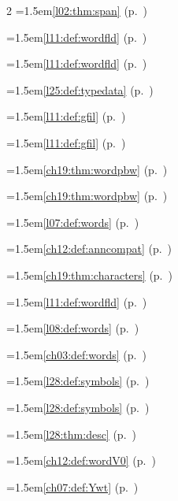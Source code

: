 \begin{multicols}{2}
\hangindent=1.5em\quad \ref{l02:thm:span} (p.~\pageref{l02:thm:span})\par
\hangindent=1.5em\quad \ref{l11:def:wordfld} (p.~\pageref{l11:def:wordfld})\par
\hangindent=1.5em\quad \ref{l11:def:wordfld} (p.~\pageref{l11:def:wordfld})\par
\hangindent=1.5em\quad \ref{l25:def:typedata} (p.~\pageref{l25:def:typedata})\par
\hangindent=1.5em\quad \ref{l11:def:gfil} (p.~\pageref{l11:def:gfil})\par
\hangindent=1.5em\quad \ref{l11:def:gfil} (p.~\pageref{l11:def:gfil})\par
\hangindent=1.5em\quad \ref{ch19:thm:wordpbw} (p.~\pageref{ch19:thm:wordpbw})\par
\hangindent=1.5em\quad \ref{ch19:thm:wordpbw} (p.~\pageref{ch19:thm:wordpbw})\par
\hangindent=1.5em\quad \ref{l07:def:words} (p.~\pageref{l07:def:words})\par
\hangindent=1.5em\quad \ref{ch12:def:anncompat} (p.~\pageref{ch12:def:anncompat})\par
\hangindent=1.5em\quad \ref{ch19:thm:characters} (p.~\pageref{ch19:thm:characters})\par
\hangindent=1.5em\quad \ref{l11:def:wordfld} (p.~\pageref{l11:def:wordfld})\par
\hangindent=1.5em\quad \ref{l08:def:words} (p.~\pageref{l08:def:words})\par
\hangindent=1.5em\quad \ref{ch03:def:words} (p.~\pageref{ch03:def:words})\par
\hangindent=1.5em\quad \ref{l28:def:symbols} (p.~\pageref{l28:def:symbols})\par
\hangindent=1.5em\quad \ref{l28:def:symbols} (p.~\pageref{l28:def:symbols})\par
\hangindent=1.5em\quad \ref{l28:thm:desc} (p.~\pageref{l28:thm:desc})\par
\hangindent=1.5em\quad \ref{ch12:def:wordV0} (p.~\pageref{ch12:def:wordV0})\par
\hangindent=1.5em\quad \ref{ch07:def:Ywt} (p.~\pageref{ch07:def:Ywt})\par

\end{multicols}
